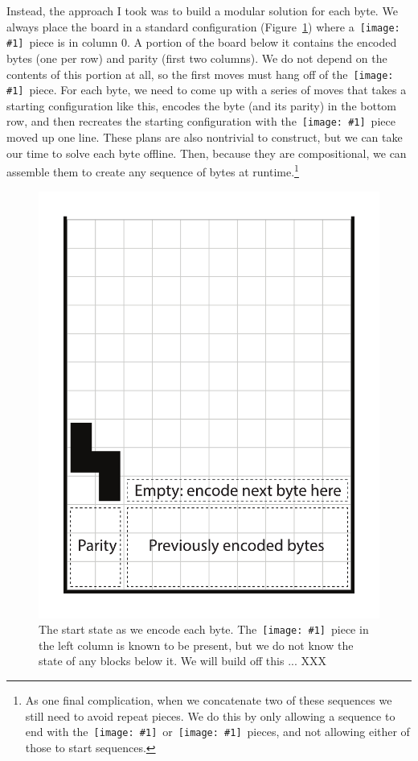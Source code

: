 \documentclass[twocolumn]{article}
\newcommand\tetrispiece[1]{\,\texttt{[image: \#1]}\hspace{0.1em}}
\newcommand\ihoriz{\tetrispiece{i_horiz}}
\newcommand\shoriz{\tetrispiece{s_horiz}}
\newcommand\svert{\tetrispiece{s_vert}}
\begin{document}
Instead, the approach I took was to build a modular solution for each
byte. We always place the board in a standard configuration
(Figure~\ref{fig:encodingscheme}) where a \svert\ piece is in column
0. A portion of the board below it contains the encoded bytes (one per
row) and parity (first two columns). We do not depend on the contents
of this portion at all, so the first moves must hang off of the
\svert\ piece. For each byte, we need to come up with a series of
moves that takes a starting configuration like this, encodes the byte
(and its parity) in the bottom row, and then recreates the starting
configuration with the \svert\ piece moved up one line. These plans
are also nontrivial to construct, but we can take our time to solve
each byte offline. Then, because they are compositional, we can assemble
them to create any sequence of bytes at runtime.\footnote{
  As one final complication, when we concatenate two of these sequences
  we still need to avoid repeat pieces. We do this by only allowing a
  sequence to end with the \shoriz\ or \ihoriz\ pieces, and not
  allowing either of those to start sequences.}

\begin{figure}
  \includegraphics[width=0.6 \linewidth]{encodingscheme}
  \caption{
    The start state as we encode each byte. The \svert\ piece in the
    left column is known to be present, but we do not know the state
    of any blocks below it. We will build off this ... XXX
    } \label{fig:encodingscheme}
\end{figure}
\end{document}
